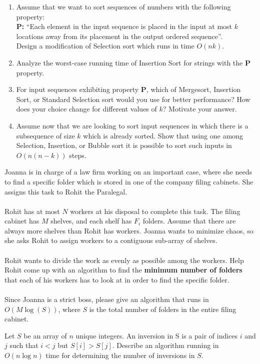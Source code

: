 \documentclass{common/cs157}
\begin{document}
\homeworkhandin 

\begin{problem}{1}
\begin{enumerate}
    \item Assume that we want to sort sequences of numbers with the following property:\\
    \textbf{P:} ``Each element in the input sequence is placed in the input at most $k$ locations away from its placement in the output ordered sequence''. \\
    Design a modification of Selection sort which runs in time $O(nk)$.
    \item Analyze the worst-case running time of Insertion Sort for strings with the $\textbf{P}$ property.
    \item For input sequences exhibiting property \textbf{P}, which of Mergesort, Insertion Sort, or Standard Selection sort would you use for better performance? How does your choice change for different values of $k$? Motivate your answer. 
    \item Assume now that we are looking to sort input sequences in which there is a subsequence of size $k$ which is already sorted. Show that using one among Selection, Insertion, or Bubble sort it is possible to sort such inputs in $O(n(n-k))$ steps.
\end{enumerate}
\end{problem}

\newpage

\begin{problem}{2}
Joanna is in charge of a law firm working on an important case, where she needs to find a specific folder which is stored in one of the company filing cabinets. She assigns this task to Rohit the Paralegal. 
\\\\
Rohit has at most $N$ workers at his disposal to complete this task. The filing cabinet has $M$ shelves, and each shelf has $F_i$ folders. Assume that there are always more shelves than Rohit has workers. Joanna wants to minimize chaos, so she asks Rohit to assign workers to a contiguous sub-array of shelves. 
\\\\
Rohit wants to divide the work as evenly as possible among the workers. Help Rohit come up with an algorithm to find the \textbf{minimum number of folders} that each of his workers has to look at in order to find the specific folder.\\ 
\\
Since Joanna is a strict boss, please give an algorithm that runs in $O(M\log(S))$, where $S$ is the total number of folders in the entire filing cabinet.
\end{problem}

\newpage

\begin{problem}{3}
Let $S$ be an array of $n$ unique integers. An
inversion in S is a pair of indices $i$ and $j$ such that $i<j$ but $S[i] > S[j]$. Describe an algorithm running in $O(n \log{n})$ time for determining the number of inversions in $S$.
\end{problem}
\end{document}
